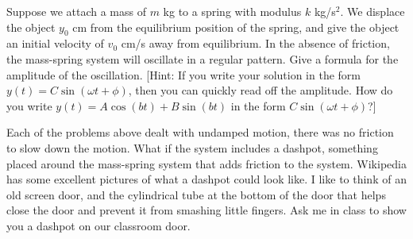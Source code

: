 \begin{problem*}[Optional]
 Suppose we attach a mass of $m$ kg to a spring with modulus $k$ kg/s$^2$. We displace the object $y_0$ cm from the equilibrium position of the spring, and give the object an initial velocity of $v_0$ cm/s away from equilibrium. In the absence of friction, the mass-spring system will oscillate in a regular pattern. Give a formula for the amplitude of the oscillation. [Hint: If you write your solution in the form $y(t) = C\sin(\omega t+\phi)$, then you can quickly read off the amplitude. How do you write $y(t) = A\cos(bt)+B\sin(bt)$ in the form $C\sin(\omega t+\phi)$?] 
\end{problem*}

Each of the problems above dealt with undamped motion, there was no friction to slow down the motion.  What if the system includes a dashpot, something placed around the mass-spring system that adds friction to the system. Wikipedia has some excellent pictures of what a dashpot could look like.  I like to think of an old screen door, and the cylindrical tube at the bottom of the door that helps close the door and prevent it from smashing little fingers.  Ask me in class to show you a dashpot on our classroom door.

